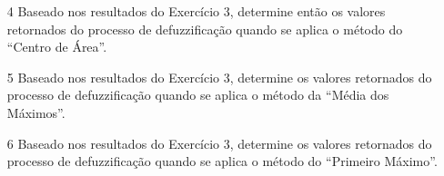 \documentclass{report}
\begin{document}
\begin{enumerate}
\item[4]  Baseado nos resultados do Exercício 3, determine então os valores retornados do processo de
defuzzificação quando se aplica o método do “Centro de Área”.


\item[5]  Baseado nos resultados do Exercício 3, determine os valores retornados do processo de
defuzzificação quando se aplica o método da “Média dos Máximos”.


\item[6]  Baseado nos resultados do Exercício 3, determine os valores retornados do processo de
defuzzificação quando se aplica o método do “Primeiro Máximo”.


\end{enumerate}


% 
\end{document}
